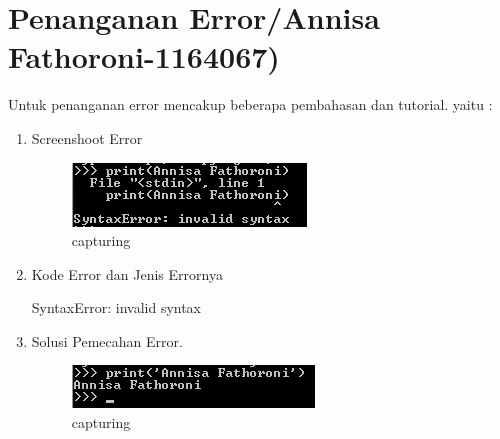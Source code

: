 \section{Penanganan Error/Annisa Fathoroni-1164067)}
Untuk penanganan error mencakup beberapa pembahasan dan tutorial. yaitu :
\begin{enumerate}
\item Screenshoot Error

\begin{figure}[ht]
\centering
\includegraphics[scale=0.5]{figures/Capture8.png}
\caption{capturing}
\label{loading an example dataset}
\end{figure}

\item Kode Error dan Jenis Errornya

SyntaxError: invalid syntax

\item Solusi Pemecahan Error.

\begin{figure}[ht]
\centering
\includegraphics[scale=0.5]{figures/Capture9.png}
\caption{capturing}
\label{loading an example dataset}
\end{figure}

\end{enumerate}